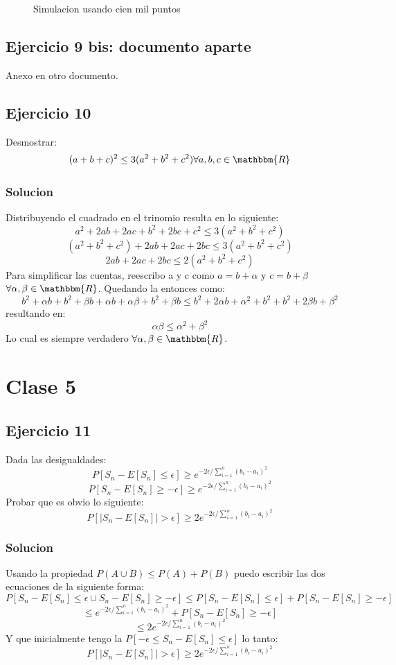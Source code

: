 \documentclass[12pt, a4paper]{article}
\begin{document}
\begin{figure}[H]
\begin{minipage}[b]{.3\linewidth}
		\label{fig:cien_mil_13}
	\end{minipage}
	\caption{Simulacion usando cien mil puntos}\label{fig:cien_mil}
\end{figure}

\subsection{Ejercicio 9 bis: documento aparte}
	Anexo en otro documento.
\subsection{Ejercicio 10}

Desmostrar:
		$$(a+b+c)^2 \leq 3(a^2+b^2+c^2) \forall a,b,c \in \mathbbm{R}$$
\subsubsection{Solucion}

Distribuyendo el cuadrado en el trinomio resulta en lo siguiente:
		$$a^2+2ab+2ac+b^2+2bc+c^2 \leq 3(a^2+b^2+c^2)$$
		$$(a^2+b^2+c^2)+2ab+2ac+2bc \leq 3(a^2+b^2+c^2)$$
		$$2ab+2ac+2bc \leq 2(a^2+b^2+c^2)$$
Para simplificar las cuentas, reescribo a y c como $a = b+\alpha$ y $c = b+\beta$  $\forall \alpha, \beta \in \mathbbm{R}$. Quedando la entonces como:
		$$b^2+\alpha b+b^2+\beta b+\alpha b+\alpha \beta+b^2+\beta b \leq b^2+2\alpha b+\alpha^2+b^2+b^2+2\beta b+\beta^2$$
resultando en:
		$$\alpha \beta \leq \alpha^2+\beta^2$$
Lo cual es siempre verdadero $\forall \alpha,\beta \in \mathbbm{R}$.

\section{Clase 5}
\subsection{Ejercicio 11}
Dada las desigualdades:
		$$P[S_n - E[S_n] \leq \epsilon ] \geq e^{-2\epsilon/\sum\limits_{i=1}^{n}(b_i-a_i)^2}$$
		$$P[S_n - E[S_n] \geq -\epsilon ] \geq e^{-2\epsilon/\sum\limits_{i=1}^{n}(b_i-a_i)^2}$$
Probar que es obvio lo siguiente:
		$$P[|S_n - E[S_n]| > \epsilon ] \geq 2 e^{-2\epsilon/\sum\limits_{i=1}^{n}(b_i-a_i)^2}$$
\subsubsection{Solucion}
Usando la propiedad $P(A\cup B) \leq P(A) + P(B)$ puedo escribir las dos ecuaciones de la siguiente forma:
		$$P[S_n - E[S_n] \leq \epsilon \cup S_n - E[S_n] \geq -\epsilon ] \leq P[S_n - E[S_n] \leq \epsilon ] + P[S_n - E[S_n] \geq -\epsilon ]$$
		$$\leq e^{-2\epsilon/\sum\limits_{i=1}^{n}(b_i-a_i)^2} + P[S_n - E[S_n] \geq -\epsilon ]$$
		$$\leq 2 e^{-2\epsilon/\sum\limits_{i=1}^{n}(b_i-a_i)^2}$$
Y que inicialmente tengo la $P[-\epsilon \leq S_n - E[S_n] \leq \epsilon ]$ lo tanto:
		$$P[|S_n - E[S_n]| > \epsilon ] \geq 2 e^{-2\epsilon/\sum\limits_{i=1}^{n}(b_i-a_i)^2}$$
\end{document}

